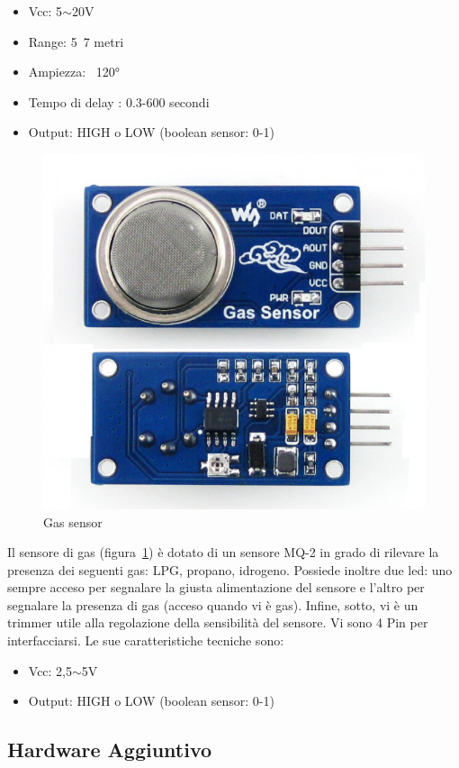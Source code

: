 \begin{itemize}
	\item Vcc: 5$\sim$20V
	\item Range: 5~7 metri
	\item Ampiezza: ~120°
	\item Tempo di delay : 0.3-600 secondi
	\item Output: HIGH o LOW (boolean sensor: 0-1)
\end{itemize}


\begin{figure}
	\centering
	\includegraphics[width=0.7\linewidth]{Figures/Sensors&Rasp/mq-2}
	\caption[gas]{Gas sensor}
	\label{fig:mq2}

\end{figure}

Il sensore di gas (figura~\ref{fig:mq2}) è dotato di un sensore MQ-2 in grado di rilevare la presenza dei seguenti gas:  LPG, propano, idrogeno. Possiede inoltre due led: uno sempre acceso per segnalare la giusta alimentazione del sensore e l'altro per segnalare la presenza di gas (acceso quando vi è gas). Infine, sotto, vi è un trimmer utile alla regolazione della sensibilità del sensore. Vi sono 4 Pin per interfacciarsi.
Le sue caratteristiche tecniche sono: 

\begin{itemize}
	\item Vcc: 2,5$\sim$5V
	\item Output: HIGH o LOW (boolean sensor: 0-1)
\end{itemize}

\newpage



\subsection{Hardware Aggiuntivo}

